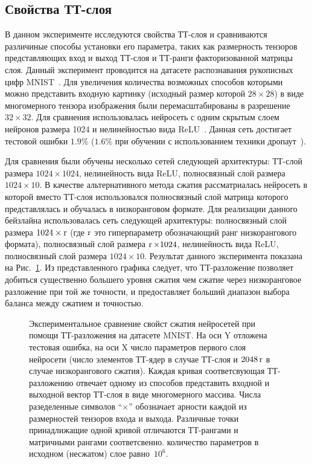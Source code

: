 \subsection{Свойства ТТ-слоя \label{sec:mnist-shapes}}

В данном эксперименте исследуются свойства ТТ-слоя и сравниваются различиные способы установки его параметра, таких как размерность тензоров представляющих вход и выход ТТ-слоя и ТТ-ранги факторизованной матрицы слоя. Данный эксперимент проводится на датасете распознавания рукописных цифр MNIST~\cite{lecun1998mnist}. Для увеличения количества возможных способов которыми можно представить входную картинку (исходный размер которой $28 \times 28$) в виде многомерного тензора изображения были перемасштабированы в разрешение $32 \times 32$. Для сравнения использовалась нейросеть с одним скрытым слоем нейронов размера 1024 и нелинейностью вида ReLU~\cite{RELU}. Данная сеть достигает тестовой ошибки  $1.9\%$ ($1.6\%$ при обучении с использованием техники дропаут~\cite{dropout}).

Для сравнения были обучены несколько сетей следующей архитектуры: ТТ-слой размера $1024 \times 1024$, нелинейность вида ReLU, полносвязный слой размера $1024 \times 10$. В качестве альтернативного метода сжатия рассматриалась нейросеть в которой вместо ТТ-слоя использовался полносвязный слой матрица которого представлялась и обучалась в низкоранговом формате. Для реализации данного бейзлайна использовалась сеть следующей архитектуры: полносвязный слой размера $1024 \times \operatorname{r}$ (где $\operatorname{r}$ это гиперпараметр обозначающий ранг низкорангового формата), полносвязный слой размера $\operatorname{r} \times 1024$, нелинейность вида ReLU, полносвязный слой размера $1024 \times 10$. Результат данного эксперимента показана на Рис.~\ref{fig:mnist-shape}. Из представленного графика следует, что ТТ-разложение позволяет добиться существенно большего уровня сжатия чем сжатие через низкоранговое разложение при той же точности, и предоставляет больший диапазон выбора баланса между сжатием и точностью.



\begin{figure}[t]
  \begin{center}
  \setlength\figureheight{5.2cm}
  \setlength\figurewidth{9cm}
  
  \end{center}
  \caption{Экспериментальное сравнение свойст сжатия нейросетей при помощи ТТ-разложения на датасете MNIST. На оси Y отложена тестовая ошибка, на оси X число параметров первого слоя нейросети (число элементов ТТ-ядер в случае ТТ-слоя и $2048  \operatorname{r}$ в случае низкорангового сжатия). Каждая кривая соответсвующая ТТ-разложению отвечает одному из способов представить входной и выходной вектор ТТ-слоя в виде многомерного массива. Числа разеделенные символов  ``$\times$'' обозначает арности каждой из размерностей тензоров входа и выхода. Различные точки принадлижащие одной кривой отличаются ТТ-рангами и матричными рангами соответсвенно. количество параметров в исходном (несжатом) слое равно~$10^6$. \label{fig:mnist-shape}}
\end{figure}


